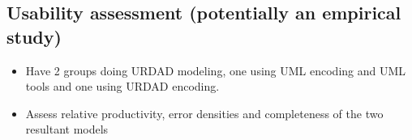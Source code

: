 
\subsection{Usability assessment (potentially an empirical study)}

\begin{itemize}
 \item Have 2 groups doing URDAD modeling, one using UML encoding and UML tools and one using URDAD encoding.
 \item Assess relative productivity, error densities and completeness of the two resultant models 
\end{itemize}


